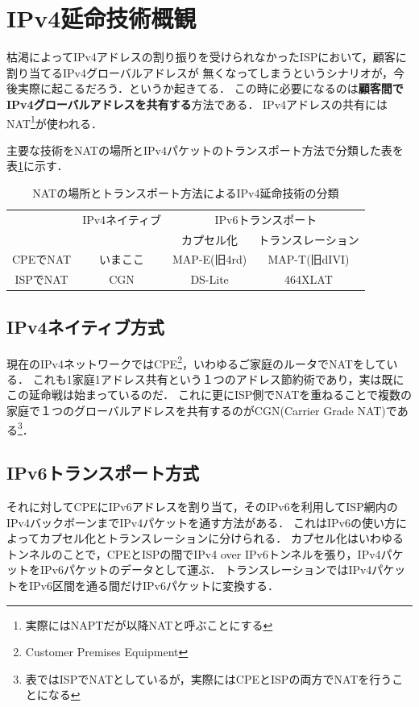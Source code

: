 \section{IPv4延命技術概観}

枯渇によってIPv4アドレスの割り振りを受けられなかったISPにおいて，顧客に割り当てるIPv4グローバルアドレスが
無くなってしまうというシナリオが，今後実際に起こるだろう．というか起きてる．
この時に必要になるのは\textbf{顧客間でIPv4グローバルアドレスを共有する}方法である．
IPv4アドレスの共有にはNAT\footnote{実際にはNAPTだが以降NATと呼ぶことにする}が使われる．

主要な技術をNATの場所とIPv4パケットのトランスポート方法で分類した表を表\ref{yuyarin-nat-transport}に示す．

\begin{table}[htbp]
\begin{center}
\begin{tabular}{c|ccc} \hline
 & IPv4ネイティブ & \multicolumn{2}{c}{IPv6トランスポート} \\
 & & カプセル化 & トランスレーション \\\hline
CPEでNAT & いまここ & MAP-E(旧4rd) & MAP-T(旧dIVI) \\
ISPでNAT & CGN & DS-Lite & 464XLAT \\\hline
\end{tabular}
\end{center}
\caption{NATの場所とトランスポート方法によるIPv4延命技術の分類}
\label{yuyarin-nat-transport}
\end{table}

\subsection{IPv4ネイティブ方式}

現在のIPv4ネットワークではCPE\footnote{Customer Premises Equipment}，いわゆるご家庭のルータでNATをしている．
これも1家庭1アドレス共有という１つのアドレス節約術であり，実は既にこの延命戦は始まっているのだ．
これに更にISP側でNATを重ねることで複数の家庭で１つのグローバルアドレスを共有するのがCGN(Carrier Grade NAT)である\footnote{表ではISPでNATとしているが，実際にはCPEとISPの両方でNATを行うことになる}．

\subsection{IPv6トランスポート方式}
それに対してCPEにIPv6アドレスを割り当て，そのIPv6を利用してISP網内のIPv4バックボーンまでIPv4パケットを通す方法がある．
これはIPv6の使い方によってカプセル化とトランスレーションに分けられる．
カプセル化はいわゆるトンネルのことで，CPEとISPの間でIPv4 over IPv6トンネルを張り，IPv4パケットをIPv6パケットのデータとして運ぶ．
トランスレーションではIPv4パケットをIPv6区間を通る間だけIPv6パケットに変換する．

